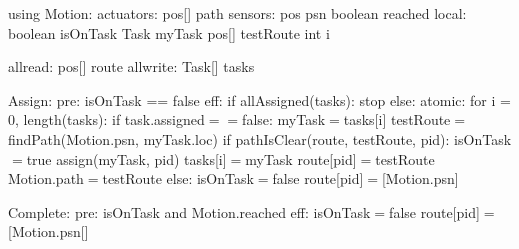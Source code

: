 using Motion:
  actuators:
    pos[] path
  sensors:
    pos psn
    boolean reached
local:
  boolean isOnTask
  Task myTask
  pos[] testRoute
  int i

allread:
  pos[] route
allwrite:
  Task[] tasks

Assign:
  pre: isOnTask == false
  eff: if allAssigned(tasks): stop
    else: atomic:
      for i = 0, length(tasks):
        if task.assigned$==$false:
          myTask$=$tasks[i]
            testRoute$=$findPath(Motion.psn, myTask.loc)
            if pathIsClear(route, testRoute, pid):
              isOnTask$=$true
              assign(myTask, pid)
              tasks[i]$=$myTask
              route[pid]$=$testRoute
              Motion.path$=$testRoute
            else:
              isOnTask$=$false
              route[pid]$=$[Motion.psn]

Complete:
    pre: isOnTask and Motion.reached
    eff: isOnTask$=$false
         route[pid]$=$[Motion.psn[]